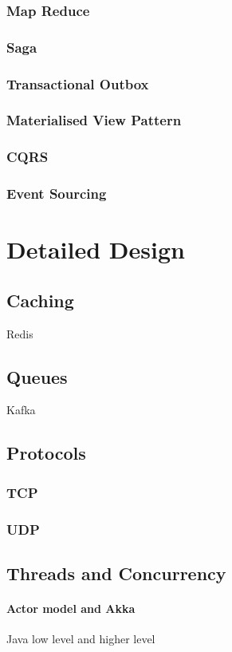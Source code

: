 \documentclass[a4paper, 11pt]{book}
\begin{document}
    \subsubsection{Map Reduce}
    \subsubsection{Saga}
    \subsubsection{Transactional Outbox}
    \subsubsection{Materialised View Pattern}
    \subsubsection{CQRS}
    \subsubsection{Event Sourcing}

    \section{Detailed Design}
    \lipsum[5]

    \subsection{Caching}
    Redis
    \subsection{Queues}
    Kafka
    \subsection{Protocols}
    \subsubsection{TCP}
    \subsubsection{UDP}
    \subsection{Threads and Concurrency}
    \paragraph{Actor model and Akka}
    Java low level and higher level
\end{document}
